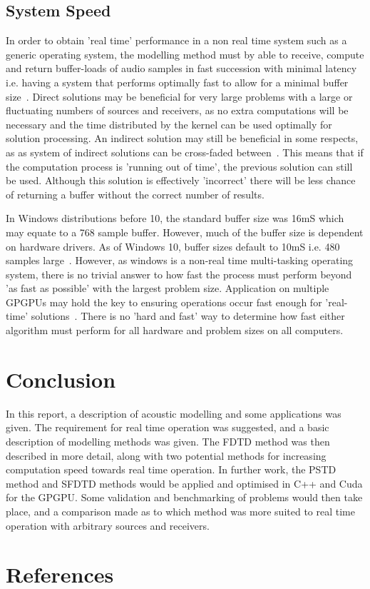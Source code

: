 \documentclass{svproc}
\begin{document}
\subsection{System Speed}
In order to obtain 'real time' performance in a non real time system such as a generic operating system, the modelling method must by able to receive, compute and return buffer-loads of audio samples in fast succession with minimal latency~\cite{Pirkle2013} i.e. having a system that performs optimally fast to allow for a minimal buffer size~\cite{Microsoft2016}. Direct solutions may be beneficial for very large problems with a large or fluctuating numbers of sources and receivers, as no extra computations will be necessary and the time distributed by the kernel can be used optimally for solution processing. An indirect solution may still be beneficial in some respects, as as system of indirect solutions can be cross-faded between~\cite{Galvez2016}. This means that if the computation process is 'running out of time', the previous solution can still be used. Although this solution is effectively 'incorrect' there will be less chance of returning a buffer without the correct number of results.

In Windows distributions before 10, the standard buffer size was 16mS which may equate to a 768 sample buffer. However, much of the buffer size is dependent on hardware drivers. As of Windows 10, buffer sizes default to 10mS i.e. 480 samples large~\cite{Microsoft2016}. However, as windows is a non-real time multi-tasking operating system, there is no trivial answer to how fast the process must perform beyond 'as fast as possible' with the largest problem size. Application on multiple GPGPUs may hold the key to ensuring operations occur fast enough for 'real-time' solutions~\cite{Savioja2010}. There is no 'hard and fast' way to determine how fast either algorithm must perform for all hardware and problem sizes on all computers.

\section{Conclusion}
In this report, a description of acoustic modelling and some applications was given. The requirement for real time operation was suggested, and a basic description of modelling methods was given. The FDTD method was then described in more detail, along with two potential methods for increasing computation speed towards real time operation. In further work, the PSTD method and SFDTD methods would be applied and optimised in C++ and Cuda for the GPGPU. Some validation and benchmarking of problems would then take place, and a comparison made as to which method was more suited to real time operation with arbitrary sources and receivers.


\section{References}


\end{document}
